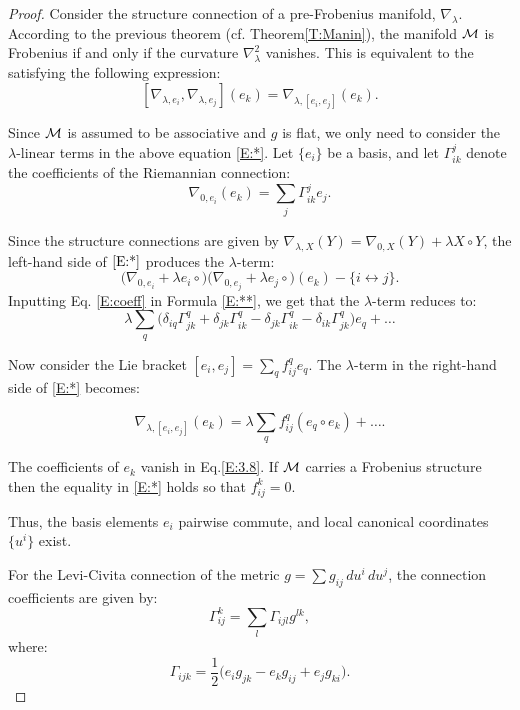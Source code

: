 \begin{proof}

Consider the structure connection of a pre-Frobenius manifold, $\nabla_\lambda$. According to the previous theorem (cf. Theorem\ref{T:Manin}), the manifold $\mathcal{M}$ is Frobenius if and only if the curvature $\nabla_\lambda^2$ vanishes. This is equivalent to the satisfying the following expression:
\begin{equation}\label{E:*}
    [\nabla_{\lambda, e_i}, \nabla_{\lambda, e_j}](e_k) = \nabla_{\lambda, [e_i, e_j]}(e_k).
\end{equation}


Since $\mathcal{M}$ is assumed to be associative and $g$ is flat, we only need to consider the $\lambda$-linear terms in the above equation \ref{E:*}. Let $\{e_i\}$ be a basis, and let $\Gamma_{ik}^j$ denote the coefficients of the Riemannian connection:
\begin{equation}\label{E:coeff}
    \nabla_{0, e_i}(e_k) = \sum_j \Gamma_{ik}^j e_j.
\end{equation}


Since the structure connections are given by $\nabla_{\lambda, X}(Y) = \nabla_{0, X}(Y) + \lambda X \circ Y$, the left-hand side of $\ref{E:*}$ produces the $\lambda$-term:
\begin{equation}\label{E:**}
    \big(\nabla_{0, e_i} + \lambda e_i \circ\big)\big(\nabla_{0, e_j} + \lambda e_j \circ\big)(e_k) - \{i \leftrightarrow j\}.
\end{equation}
Inputting Eq. \ref{E:coeff} in Formula \ref{E:**}, we get that the $\lambda$-term reduces to:
\begin{equation}\label{E:3.8}
    \lambda \sum_q \big(\delta_{iq} \Gamma_{jk}^q + \delta_{jk} \Gamma_{ik}^q - \delta_{jk} \Gamma_{ik}^q - \delta_{ik} \Gamma_{jk}^q\big)e_q + \dots
\end{equation}


Now consider the Lie bracket $[e_i, e_j] = \sum\limits_q f_{ij}^q e_q$. The $\lambda$-term in the right-hand side of \ref{E:*} becomes:

\[
\nabla_{\lambda, [e_i, e_j]}(e_k) = \lambda \sum_q f_{ij}^q (e_q \circ e_k) + \dots.
\]

The coefficients of $e_k$ vanish in Eq.\ref{E:3.8}. If $\mathcal{M}$ carries a Frobenius structure then the equality in \ref{E:*} holds so that $f_{ij}^k=0$.

Thus, the basis elements $e_i$ pairwise commute, and local canonical coordinates $\{u^i\}$ exist.

For the Levi-Civita connection of the metric $g = \sum g_{ij} \, du^i \, du^j$, the connection coefficients are given by:
\[
\Gamma_{ij}^k = \sum_l \Gamma_{ijl} g^{lk},
\]
where:
\[
\Gamma_{ijk} = \frac{1}{2}\big(e_i g_{jk} - e_k g_{ij} + e_j g_{ki}\big).
\]


\end{proof}
